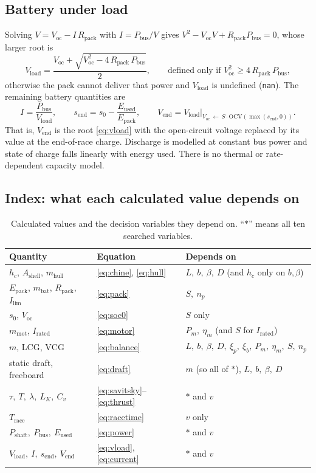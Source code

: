 \documentclass[11pt,a4paper]{article}
\renewcommand{\_}{\textunderscore\allowbreak}
\newcommand{\code}[1]{\texttt{#1}}
\newcommand{\Trace}{T_{\mathrm{race}}}
\newcommand{\Pshaft}{P_{\mathrm{shaft}}}
\newcommand{\Pbus}{P_{\mathrm{bus}}}
\newcommand{\Eused}{E_{\mathrm{used}}}
\newcommand{\Epack}{E_{\mathrm{pack}}}
\newcommand{\Voc}{V_{\mathrm{oc}}}
\newcommand{\Vload}{V_{\mathrm{load}}}
\newcommand{\Vend}{V_{\mathrm{end}}}
\newcommand{\Rpack}{R_{\mathrm{pack}}}
\newcommand{\lcg}{\mathrm{LCG}}
\newcommand{\vcg}{\mathrm{VCG}}
\begin{document}
\subsection{Battery under load}
Solving $V = \Voc - I\,\Rpack$ with $I=\Pbus/V$ gives $V^2-\Voc V+\Rpack\Pbus=0$, whose larger root is
\begin{equation}
  \Vload = \frac{\Voc + \sqrt{\Voc^2 - 4\,\Rpack\,\Pbus}}{2},
  \qquad \text{defined only if } \Voc^2 \ge 4\,\Rpack\,\Pbus,
  \label{eq:vload}
\end{equation}
otherwise the pack cannot deliver that power and $\Vload$ is undefined (\code{nan}). The remaining battery quantities are
\begin{equation}
  I = \frac{\Pbus}{\Vload},\qquad
  s_{\mathrm{end}} = s_0 - \frac{\Eused}{\Epack},\qquad
  \Vend = \Vload\Big|_{\Voc\,\leftarrow\,S\cdot\mathrm{OCV}(\max(s_{\mathrm{end}},0))}.
  \label{eq:current}
\end{equation}
That is, $\Vend$ is the root \eqref{eq:vload} with the open-circuit voltage replaced by its value at the end-of-race charge.
Discharge is modelled at constant bus power and state of charge falls linearly with energy used. There is no thermal or
rate-dependent capacity model.

\subsection{Index: what each calculated value depends on}
\begin{table}[H]
\centering\small
\caption{Calculated values and the decision variables they depend on. ``$\ast$'' means all ten searched variables.}
\label{tab:index}
\begin{tabularx}{\textwidth}{@{}l l X@{}}
\toprule
Quantity & Equation & Depends on \\
\midrule
$h_c$, $A_{\mathrm{shell}}$, $m_{\mathrm{hull}}$ & \eqref{eq:chine}, \eqref{eq:hull} & $L,\ b,\ \beta,\ D$ (and $h_c$ only on $b,\beta$) \\
$\Epack$, $m_{\mathrm{bat}}$, $\Rpack$, $I_{\lim}$ & \eqref{eq:pack} & $S,\ n_p$ \\
$s_0$, $\Voc$ & \eqref{eq:soc0} & $S$ only \\
$m_{\mathrm{mot}}$, $I_{\mathrm{rated}}$ & \eqref{eq:motor} & $P_m,\ \eta_m$ (and $S$ for $I_{\mathrm{rated}}$) \\
$m$, $\lcg$, $\vcg$ & \eqref{eq:balance} & $L,\ b,\ \beta,\ D,\ \xi_p,\ \xi_b,\ P_m,\ \eta_m,\ S,\ n_p$ \\
static draft, freeboard & \eqref{eq:draft} & $m$ (so all of $\ast$), $L,\ b,\ \beta,\ D$ \\
$\tau,\ T,\ \lambda,\ L_K,\ C_v$ & \eqref{eq:savitsky}--\eqref{eq:thrust} & $\ast$ and $v$ \\
$\Trace$ & \eqref{eq:racetime} & $v$ only \\
$\Pshaft,\ \Pbus,\ \Eused$ & \eqref{eq:power} & $\ast$ and $v$ \\
$\Vload,\ I,\ s_{\mathrm{end}},\ \Vend$ & \eqref{eq:vload}, \eqref{eq:current} & $\ast$ and $v$ \\
\bottomrule
\end{tabularx}
\end{table}
\end{document}
